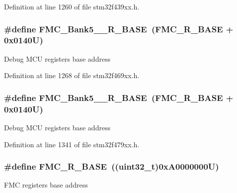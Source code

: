 Definition at line 1260 of file stm32f439xx.\+h.

\subsubsection[{\texorpdfstring{F\+M\+C\+\_\+\+Bank5\+\_\+6\+\_\+\+R\+\_\+\+B\+A\+SE}{FMC_Bank5_6_R_BASE}}]{\setlength{\rightskip}{0pt plus 5cm}\#define F\+M\+C\+\_\+\+Bank5\+\_\+\_\+\+R\+\_\+\+B\+A\+SE~({\bf F\+M\+C\+\_\+\+R\+\_\+\+B\+A\+SE} + 0x0140\+U)}\hypertarget{group___peripheral__memory__map_gace117149a4fc0d07c38cc997fe4c4a73}{}\label{group___peripheral__memory__map_gace117149a4fc0d07c38cc997fe4c4a73}
Debug M\+CU registers base address 

Definition at line 1268 of file stm32f469xx.\+h.

\subsubsection[{\texorpdfstring{F\+M\+C\+\_\+\+Bank5\+\_\+6\+\_\+\+R\+\_\+\+B\+A\+SE}{FMC_Bank5_6_R_BASE}}]{\setlength{\rightskip}{0pt plus 5cm}\#define F\+M\+C\+\_\+\+Bank5\+\_\+\_\+\+R\+\_\+\+B\+A\+SE~({\bf F\+M\+C\+\_\+\+R\+\_\+\+B\+A\+SE} + 0x0140\+U)}\hypertarget{group___peripheral__memory__map_gace117149a4fc0d07c38cc997fe4c4a73}{}\label{group___peripheral__memory__map_gace117149a4fc0d07c38cc997fe4c4a73}
Debug M\+CU registers base address 

Definition at line 1341 of file stm32f479xx.\+h.

\subsubsection[{\texorpdfstring{F\+M\+C\+\_\+\+R\+\_\+\+B\+A\+SE}{FMC_R_BASE}}]{\setlength{\rightskip}{0pt plus 5cm}\#define F\+M\+C\+\_\+\+R\+\_\+\+B\+A\+SE~((uint32\+\_\+t)0x\+A0000000\+U)}\hypertarget{group___peripheral__memory__map_ga7a599164cd92798542bc6288793d1ed5}{}\label{group___peripheral__memory__map_ga7a599164cd92798542bc6288793d1ed5}
F\+MC registers base address 

